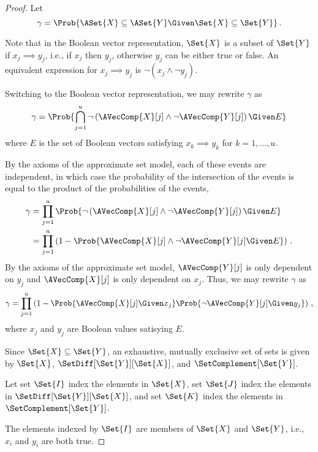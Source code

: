 \begin{proof}
Let
\begin{equation}
    \gamma = \Prob{\ASet{X} \subseteq \ASet{Y} \Given \Set{X} \subseteq 
    \Set{Y}}\,.
\end{equation}

Note that in the Boolean vector representation, $\Set{X}$ is a subset of 
$\Set{Y}$ if $x_j \implies y_j$, i.e., if $x_j$ then $y_j$, otherwise $y_j$ can 
be either true or false. An equivalent expression for $x_j \implies y_j$ is 
$\neg (x_j \land \neg y_j)$.

Switching to the Boolean vector representation, we may rewrite $\gamma$ as
\begin{equation}
    \gamma = \Prob{\bigcap_{j=1}^{u} \neg \left(\AVecComp{X}[j] \land \neg 
    \AVecComp{Y}[j]\right) \Given E}
\end{equation}
where $E$ is the set of Boolean vectors satisfying $x_k \implies y_k$ for     
$k=1,\ldots,u$.

By the axioms of the approximate set model, each of these events are 
independent, in which case the probability of the intersection of the events is 
equal to the product of the probabilities of the events,
\begin{align}
\gamma
    &= \prod_{j=1}^{u} \Prob{\neg\left(\AVecComp{X}[j] 
        \land \neg \AVecComp{Y}[j]\right) \Given E}\\
    &= \prod_{j=1}^{u} \left(1 - \Prob{\AVecComp{X}[j] 
        \land \neg \AVecComp{Y}[j] \Given E}\right)\,.
\end{align}
By the axioms of the approximate set model, $\AVecComp{Y}[j]$ is only dependent 
on $y_j$ and $\AVecComp{X}[j]$ is only dependent on $x_j$. Thus, we may rewrite 
$\gamma$ as
\begin{equation}
\gamma = \prod_{j=1}^{u}\left(
    1 - \Prob{\AVecComp{X}[j] \Given x_j}
    \Prob{\neg \AVecComp{Y}[j] \Given y_j}\right)\,,
\end{equation}
where $x_j$ and $y_j$ are Boolean values satisying $E$.

Since $\Set{X} \subseteq \Set{Y}$, an exhaustive, mutually exclusive set of 
sets is given by $\Set{X}$, $\SetDiff[\Set{Y}][\Set{X}]$, and 
$\SetComplement[\Set{Y}]$.

Let set $\Set{I}$ index the elements in $\Set{X}$, set $\Set{J}$ index 
the elements in $\SetDiff[\Set{Y}][\Set{X}]$, and set $\Set{K}$ index the 
elements in $\SetComplement[\Set{Y}]$.

The elements indexed by $\Set{I}$ are members of $\Set{X}$ and $\Set{Y}$, i.e.,
$x_i$ and $y_i$ are both true.


\end{proof}
